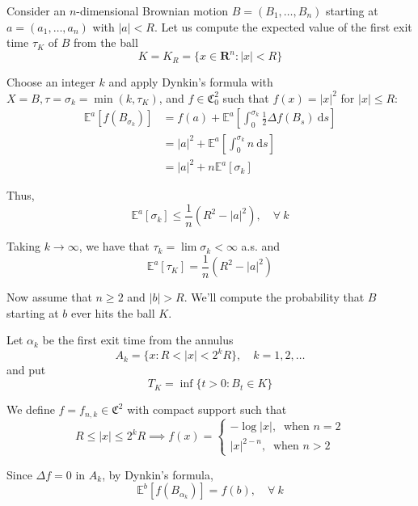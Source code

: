 \begin{example}
    Consider an $n$-dimensional Brownian motion $B = (B_1, \ldots, B_n)$ starting at $a = (a_1, \ldots, a_n)$ with $|a| < R$. Let us compute the expected value of the first exit time $\tau_K$ of $B$ from the ball 
    \[
        K = K_R = \{ x \in \textbf{R}^n : |x| < R \}
    \]

    Choose an integer $k$ and apply Dynkin's formula with $X = B, \tau = \sigma_k = \min(k, \tau_K)$, and $f \in \mathfrak{C}_0^2$ such that $f(x) = |x|^2$ for $|x| \leq R$: 
    \begin{equation*}
        \begin{aligned}
            \mathbb{E}^a [f(B_{\sigma_k})] &= f(a) + \mathbb{E}^a \left[ \int_0^{\sigma_k} \frac{1}{2} \Delta f(B_s)~\mathrm{d}s \right] \\
            &= |a|^2 + \mathbb{E}^a \left[ \int_0^{\sigma_k} n ~\mathrm{d}s \right] \\
            &= |a|^2 + n \mathbb{E}^a[\sigma_k]
        \end{aligned}  
    \end{equation*}

    Thus, 
    \[
        \mathbb{E}^a[\sigma_k] \leq \frac{1}{n} (R^2 - |a|^2), \quad \forall ~k
    \]

    Taking $k \to \infty$, we have that $\tau_k = \lim \sigma_k < \infty$ a.s. and 
    \[
        \mathbb{E}^a[\tau_K] = \frac{1}{n} (R^2 - |a|^2)
    \]

    Now assume that $n \geq 2$ and $|b| > R$. We'll compute the probability that $B$ starting at $b$ ever hits the ball $K$.

    Let $\alpha_k$ be the first exit time from the annulus 
    \[
        A_k = \{ x : R < |x| < 2^k R \}, \quad k = 1,2,\ldots 
    \]
    and put 
    \[
        T_K = \inf \{ t > 0 : B_t \in K \}
    \]

    We define $f = f_{n,k} \in \mathfrak{C}^2$ with compact support such that 
    \[
        R \leq |x| \leq 2^k R \implies f(x) = \begin{cases}
            - \log |x|, ~\text{ when } n = 2 \\
            |x|^{2-n}, ~\text{ when } n > 2
        \end{cases}
    \]

    Since $\Delta f = 0$ in $A_k$, by Dynkin's formula, 
    \begin{equation}\label{eq:202301261656}
        \mathbb{E}^b[f(B_{\alpha_k})] = f(b), \quad \forall~k
    \end{equation}


\end{example}
